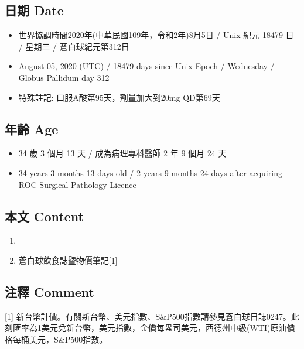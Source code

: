 \documentclass[a5paper, 11pt
]{book}
\providecommand{\tightlist}{%
  \setlength{\itemsep}{0pt}\setlength{\parskip}{0pt}}
\begin{document}
\hypertarget{ux65e5ux671f-date-65}{%
\subsection{日期 Date}\label{ux65e5ux671f-date-65}}

\begin{itemize}
\tightlist
\item
  世界協調時間2020年(中華民國109年，令和2年)8月5日 / Unix 紀元 18479 日
  / 星期三 / 蒼白球紀元第312日
\item
  August 05, 2020 (UTC) / 18479 days since Unix Epoch / Wednesday /
  Globus Pallidum day 312
\item
  特殊註記: 口服A酸第95天，劑量加大到20mg QD第69天
\end{itemize}

\hypertarget{ux5e74ux9f61-age-65}{%
\subsection{年齡 Age}\label{ux5e74ux9f61-age-65}}

\begin{itemize}
\tightlist
\item
  34 歲 3 個月 13 天 / 成為病理專科醫師 2 年 9 個月 24 天
\item
  34 years 3 months 13 days old / 2 years 9 months 24 days after
  acquiring ROC Surgical Pathology Licence
\end{itemize}

\hypertarget{ux672cux6587-content-65}{%
\subsection{本文 Content}\label{ux672cux6587-content-65}}

\begin{enumerate}
\def\labelenumi{\arabic{enumi}.}
\tightlist
\item
\item
  蒼白球飲食誌暨物價筆記{[}1{]}
\end{enumerate}

\hypertarget{ux6ce8ux91cb-comment-65}{%
\subsection{注釋 Comment}\label{ux6ce8ux91cb-comment-65}}

{[}1{]}
新台幣計價。有關新台幣、美元指數、S\&P500指數請參見蒼白球日誌0247。此刻匯率為1美元兌新台幣，美元指數，金價每盎司美元，西德州中級(WTI)原油價格每桶美元，S\&P500指數。
\end{document}
